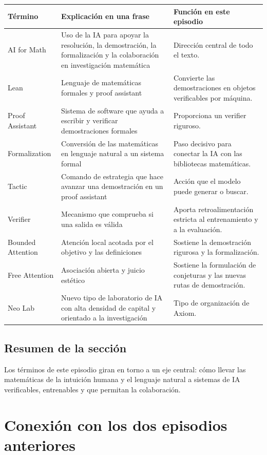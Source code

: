 \documentclass[a4paper]{article}
\begin{document}
\begin{longtable}{p{}p{}p{}}
\toprule
Término & Explicación en una frase & Función en este episodio \\
\midrule
AI for Math & Uso de la IA para apoyar la resolución, la demostración, la formalización y la colaboración en investigación matemática & Dirección central de todo el texto. \\
Lean & Lenguaje de matemáticas formales y proof assistant & Convierte las demostraciones en objetos verificables por máquina. \\
Proof Assistant & Sistema de software que ayuda a escribir y verificar demostraciones formales & Proporciona un verifier riguroso. \\
Formalization & Conversión de las matemáticas en lenguaje natural a un sistema formal & Paso decisivo para conectar la IA con las bibliotecas matemáticas. \\
Tactic & Comando de estrategia que hace avanzar una demostración en un proof assistant & Acción que el modelo puede generar o buscar. \\
Verifier & Mecanismo que comprueba si una salida es válida & Aporta retroalimentación estricta al entrenamiento y a la evaluación. \\
Bounded Attention & Atención local acotada por el objetivo y las definiciones & Sostiene la demostración rigurosa y la formalización. \\
Free Attention & Asociación abierta y juicio estético & Sostiene la formulación de conjeturas y las nuevas rutas de demostración. \\
Neo Lab & Nuevo tipo de laboratorio de IA con alta densidad de capital y orientado a la investigación & Tipo de organización de Axiom. \\
\bottomrule
\end{longtable}

\subsection{Resumen de la sección}

Los términos de este episodio giran en torno a un eje central: cómo llevar las matemáticas de la intuición humana y el lenguaje natural a sistemas de IA verificables, entrenables y que permitan la colaboración.

\section{Conexión con los dos episodios anteriores}
\end{document}
